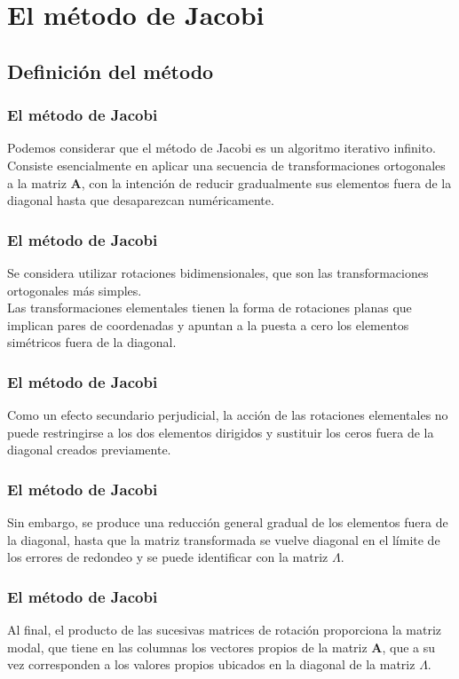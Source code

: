 \section{El método de Jacobi}
\subsection{Definición del método}
\begin{frame}
\frametitle{El método de Jacobi}
Podemos considerar que el método de Jacobi es un algoritmo iterativo infinito.
\\
\bigskip
Consiste esencialmente en aplicar una secuencia de transformaciones ortogonales a la matriz $\mathbf{A}$, con la intención de reducir gradualmente sus elementos fuera de la diagonal hasta que desaparezcan numéricamente.
\end{frame}
\begin{frame}
\frametitle{El método de Jacobi}
Se considera utilizar rotaciones bidimensionales, que son las transformaciones ortogonales más simples.
\\
\bigskip
Las transformaciones elementales tienen la forma de rotaciones planas que implican pares de coordenadas y apuntan a la puesta a cero los elementos simétricos fuera de la diagonal.
\end{frame}
\begin{frame}
\frametitle{El método de Jacobi}
Como un efecto secundario perjudicial, la acción de las rotaciones elementales no puede restringirse a los dos elementos dirigidos y sustituir los ceros fuera de la diagonal creados previamente.
\end{frame}
\begin{frame}
\frametitle{El método de Jacobi}
 Sin embargo, se produce una reducción general gradual de los elementos fuera de la diagonal, hasta que la matriz transformada se vuelve diagonal en el límite de los errores de redondeo y se puede identificar con la matriz $\Lambda$.
\end{frame}
\begin{frame}
\frametitle{El método de Jacobi}
Al final, el producto de las sucesivas matrices de rotación proporciona la matriz modal, que tiene en las columnas los vectores propios de la matriz $\mathbf{A}$, que a su vez corresponden a los valores propios ubicados en la diagonal de la matriz $\Lambda$.
\end{frame}
